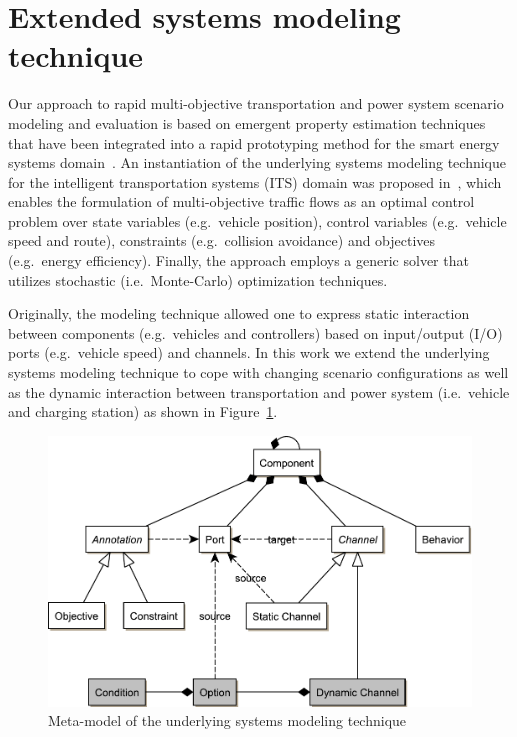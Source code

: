 \section{Extended systems modeling technique}
\label{section:foundation}

Our approach to rapid multi-objective transportation and power system scenario modeling and evaluation is based on emergent property estimation techniques \cite{hackenberg2012towards} that have been integrated into a rapid prototyping method for the smart energy systems domain~\cite{hackenberg2014rapid}. An instantiation of the underlying systems modeling technique for the intelligent transportation systems (ITS) domain was proposed in~\cite{ascher2014early}, which enables the formulation of multi-objective traffic flows as an optimal control problem over state variables (e.g.\ vehicle position), control variables (e.g.\ vehicle speed and route), constraints (e.g.\ collision avoidance) and objectives (e.g.\ energy efficiency). Finally, the approach employs a generic solver that utilizes stochastic (i.e.\ Monte-Carlo) optimization techniques.

Originally, the modeling technique allowed one to express static interaction between components (e.g.\ vehicles and controllers) based on input/output (I/O) ports (e.g.\ vehicle speed) and channels. In this work we extend the underlying systems modeling technique to cope with changing scenario configurations as well as the dynamic interaction between transportation and power system (i.e.\ vehicle and charging station) as shown in Figure~\ref{fig:meta_model}.

\begin{figure}[h]
	\centering
	\includegraphics[width=\columnwidth]{../gfx/meta_model.pdf}
	\caption{Meta-model of the underlying systems modeling technique}%
	\label{fig:meta_model}
\end{figure}

